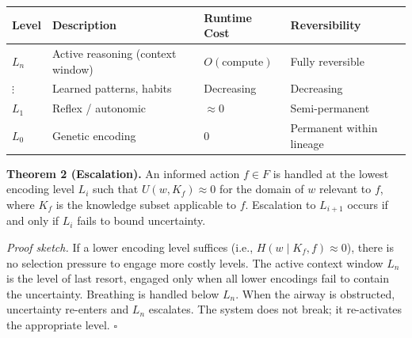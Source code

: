 \documentclass[
]{article}
\newcounter{none} %
\begin{document}
{\def\LTcaptype{none} %
\begin{longtable}[]{@{}
  >{\raggedright\arraybackslash}p{}
  >{\raggedright\arraybackslash}p{}
  >{\raggedright\arraybackslash}p{}
  >{\raggedright\arraybackslash}p{}@{}}
\toprule\noalign{}
\begin{minipage}[b]{\linewidth}\raggedright
Level
\end{minipage} & \begin{minipage}[b]{\linewidth}\raggedright
Description
\end{minipage} & \begin{minipage}[b]{\linewidth}\raggedright
Runtime Cost
\end{minipage} & \begin{minipage}[b]{\linewidth}\raggedright
Reversibility
\end{minipage} \\
\midrule\noalign{}
\endhead
\bottomrule\noalign{}
\endlastfoot
\(L_n\) & Active reasoning (context window) & \(O(\text{compute})\) &
Fully reversible \\
\(\vdots\) & Learned patterns, habits & Decreasing & Decreasing \\
\(L_1\) & Reflex / autonomic & \(\approx 0\) & Semi-permanent \\
\(L_0\) & Genetic encoding & \(0\) & Permanent within lineage \\
\end{longtable}
}

\textbf{Theorem 2 (Escalation).} An informed action \(f \in F\) is
handled at the lowest encoding level \(L_i\) such that
\(U(w, K_f) \approx 0\) for the domain of \(w\) relevant to \(f\), where
\(K_f\) is the knowledge subset applicable to \(f\). Escalation to
\(L_{i+1}\) occurs if and only if \(L_i\) fails to bound uncertainty.

\emph{Proof sketch.} If a lower encoding level suffices (i.e.,
\(H(w \mid K_f, f) \approx 0\)), there is no selection pressure to
engage more costly levels. The active context window \(L_n\) is the
level of last resort, engaged only when all lower encodings fail to
contain the uncertainty. Breathing is handled below \(L_n\). When the
airway is obstructed, uncertainty re-enters and \(L_n\) escalates. The
system does not break; it re-activates the appropriate level.
\(\square\)
\end{document}
